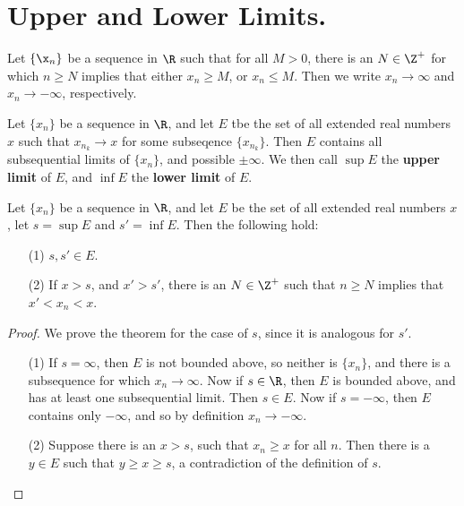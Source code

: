 \section{Upper and Lower Limits.}\label{section_3.4}

Let $\{\x_n\}$ be a sequence in  $\R$ such that for all  $M>0$, there is an  $N \in \Z^+$
for which  $n \geq N$ implies that either  $x_n \geq M$, or  $x_n \leq M$. Then we write
$x_n \rightarrow \infty$ and  $x_n \rightarrow -\infty$, respectively.

\begin{definition}
  Let $\{x_n\}$ be a sequence in $\R$, and let $E$ tbe the set of all extended real
  numbers $x$  such that $x_{n_k} \rightarrow x$ for some subseqence  $\{x_{n_k}\}$. Then
  $E$ contains all subsequential limits of  $\{x_n\}$, and possible  $\pm\infty$. We then
  call  $\sup{E}$ the  \textbf{upper limit} of $E$, and  $\inf{E}$ the \textbf{lower limit} of
  $E$.
\end{definition}

\begin{theorem}\label{4.1.1}
  Let $\{x_n\}$ be a sequence in  $\R$, and let  $E$ be the set of all extended real
  numbers  $x$, let  $s=\sup{E}$ and  $s'=\inf{E}$. Then the following hold:
  \begin{enumerate}
    \item[(1)] $s,s' \in E$.

    \item[(2)] If $x>s$, and $x'>s'$, there is an $N \in \Z^+$ such that $n \geq N$
      implies that $x'<x_n<x$.
  \end{enumerate}
\end{theorem}
\begin{proof}
  We prove the theorem for the case of $s$, since it is analogous for  $s'$.
  \begin{enumerate}
    \item[(1)] If $s=\infty$, then $E$ is not bounded above, so neither is  $\{x_n\}$, and
      there is a subsequence for which $x_n \rightarrow \infty$. Now if $s \in \R$, then
      $E$ is bounded above, and has at least one subsequential limit. Then  $s \in E$.
      Now if  $s=-\infty$, then  $E$ contains only $-\infty$, and so by definition
      $x_n \rightarrow -\infty$.

    \item[(2)] Suppose there is an $x>s$, such that  $x_n \geq x$ for all  $n$. Then there
      is a  $y \in E$ such that  $y \geq x \geq s$, a contradiction of the definition of  $s$.
  \end{enumerate}
\end{proof}

